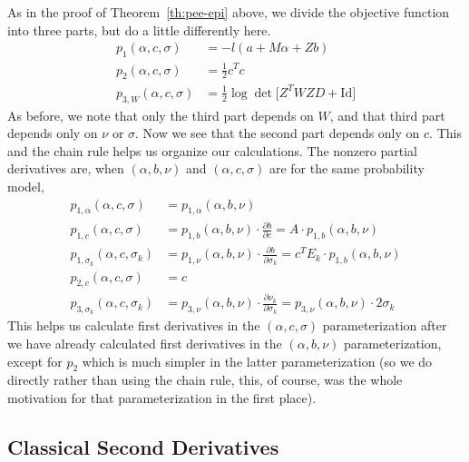 As in the proof of Theorem~\ref{th:pee-epi} above, we divide the objective
function into three parts, but do a little differently here.
\begin{align*}
   p_1(\alpha, c, \sigma)
   & =
   - l(a + M \alpha + Z b)
   \\
   p_2(\alpha, c, \sigma)
   & =
   \tfrac{1}{2} c^T c
   \\
   p_{3, W}(\alpha, c, \sigma)
   & =
   \tfrac{1}{2} \log \det \bigl[ Z^T W Z D + \text{Id} \bigr]
\end{align*}
As before, we note that only the third part depends on $W$,
and that third part depends only on $\nu$ or $\sigma$.
Now we see that the second part depends only on $c$.
This and the chain rule helps us organize our calculations.
The nonzero partial derivatives are, when $(\alpha, b, \nu)$ and
$(\alpha, c, \sigma)$ are for the same probability model,
\begin{subequations}
\begin{align}
   p_{1, \alpha}(\alpha, c, \sigma) & = p_{1, \alpha}(\alpha, b, \nu)
   \\
   p_{1, c}(\alpha, c, \sigma) & = p_{1, b}(\alpha, b, \nu) \cdot
   \frac{\partial b}{\partial c}
   = A \cdot p_{1, b}(\alpha, b, \nu)
   \\
   p_{1, \sigma_k}(\alpha, c, \sigma_k) & = p_{1, \nu}(\alpha, b, \nu) \cdot
   \frac{\partial b}{\partial \sigma_k}
   = c^T E_k \cdot p_{1, b}(\alpha, b, \nu)
   \\
   p_{2, c}(\alpha, c, \sigma) & = c
   \\
   p_{3, \sigma_k}(\alpha, c, \sigma_k) & = p_{3, \nu}(\alpha, b, \nu) \cdot
   \frac{\partial \nu_k}{\partial \sigma_k}
   = p_{3, \nu}(\alpha, b, \nu) \cdot 2 \sigma_k
\end{align}
\end{subequations}
This helps us calculate first derivatives in the $(\alpha, c, \sigma)$
parameterization after we have already calculated first derivatives
in the $(\alpha, b, \nu)$ parameterization, except for $p_2$ which is much
simpler in the latter parameterization (so we do directly rather than using
the chain rule, this, of course, was the whole motivation for
that parameterization in the first place).

\subsection{Classical Second Derivatives}
\label{sec:second-derivatives-sigma}


